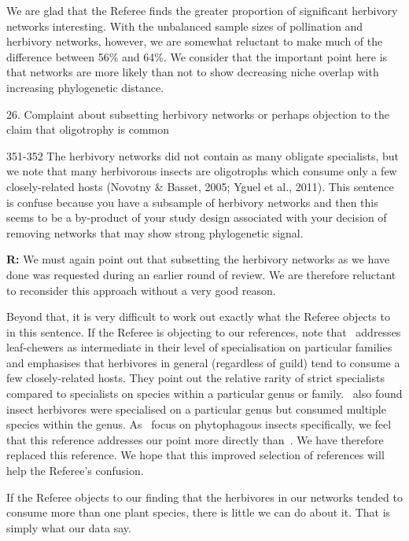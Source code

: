 \documentclass[12pt]{letter}
\newenvironment{refquote}{\bigskip \begin{it}}{\end{it}\smallskip}
\begin{document}
		We are glad that the Referee finds the greater proportion of significant herbivory networks interesting. With the unbalanced sample sizes of pollination and herbivory networks, however, we are somewhat reluctant to make much of the difference between 56\% and 64\%. We consider that the important point here is that networks are more likely than not to show decreasing niche overlap with increasing phylogenetic distance. 


	26. Complaint about subsetting herbivory networks or perhaps objection to the claim that oligotrophy is common 

		\begin{refquote}
			351-352 The herbivory networks did not contain as many obligate specialists, but we note that many herbivorous insects are oligotrophs which consume only a few closely-related hosts (Novotny \& Basset, 2005; Yguel et al., 2011). This sentence is confuse because you have a subsample of herbivory networks and then this seems to be a by-product of your study design associated with your decision of removing networks that may show strong phylogenetic signal.
		\end{refquote}


		\textbf{R:} We must again point out that subsetting the herbivory networks as we have done was requested during an earlier round of review. We are therefore reluctant to reconsider this approach without a very good reason. 


		Beyond that, it is very difficult to work out exactly what the Referee objects to in this sentence. If the Referee is objecting to our references, note that~\citet{Novotny2005} addresses leaf-chewers as intermediate in their level of specialisation on particular families and emphasises that herbivores in general (regardless of guild) tend to consume a few closely-related hosts. They point out the relative rarity of strict specialists compared to specialists on species within a particular genus or family.~\citet{Brandle2006} also found insect herbivores were specialised on a particular genus but consumed multiple species within the genus. As~\citet{Brandle2006} focus on phytophagous insects specifically, we feel that this reference addresses our point more directly than~\citet{Yguel2011}. We have therefore replaced this reference. We hope that this improved selection of references will help the Referee's confusion.


		If the Referee objects to our finding that the herbivores in our networks tended to consume more than one plant species, there is little we can do about it. That is simply what our data say. 
\end{document}
